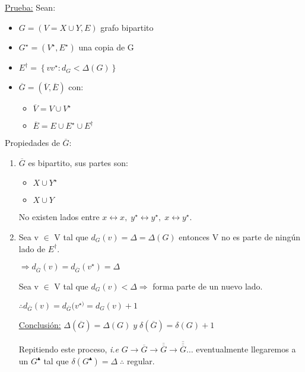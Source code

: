 \documentclass[12pt,a4paper]{report}
\begin{document}
		\underline{Prueba:} Sean:
		
		\begin{itemize}
			\item $G = (V = X \cup Y, E)$ grafo bipartito
			\item $G^{\star} = (V^{\star}, E^{\star})$ una copia de G
			\item $E^{\dag} = \left\lbrace vv^{\star} : d_{G} < \Delta(G) \right\rbrace$
			\item $\overline{G} = (\overline{V}, \overline{E})$ con:
				\begin{itemize}
					\item $\overline{V} = V \cup V^{\star}$
					\item $\overline{E} = E \cup E^{\star} \cup E^{\dag}$
				\end{itemize}
		\end{itemize}
		
		Propiedades de $\overline{G}$:
		\begin{enumerate}
			\item $\overline{G}$ es bipartito, sus partes son:
				\begin{itemize}
					\item $X \cup Y^{\star}$
					\item $X \cup Y$
				\end{itemize}
				
			No existen lados entre $x \leftrightarrow x, \; y^{\star} \leftrightarrow y^{\star}, \; x \leftrightarrow y^{\star}$.
			
			\item Sea v $\in$ V tal que $d_{G}(v) = \Delta = \Delta(G)$ entonces V no es parte de ningún lado de $E^{\dag}$.
			
			$\Rightarrow d_{\overline{G}}(v) = d_{\overline{G}}(v^{\star}) = \Delta$ 
			
			\vspace{5mm}
			Sea v $\in$ V tal que $d_{G}(v) < \Delta \Rightarrow$ forma parte de un nuevo lado. 
			
			$\therefore d_{\overline{G}}(v) = d_{\overline{G}}(v^{\star)} = d_{G}(v) + 1$
			
			\underline{Conclusión:} $ \Delta(\overline{G}) = \Delta(G) \; y \; \delta(\overline{G}) = \delta(G) + 1$
			
			Repitiendo este proceso, \textit{i.e} $G \rightarrow \overline{G} \rightarrow \overline{\overline{G}} \rightarrow \overline{\overline{\overline{G}}} \dotsc $ eventualmente llegaremos a un $G^{\blacktriangle}$ tal que $\delta(G^{\blacktriangle}) = \Delta \; \therefore $ regular.
		\end{enumerate}
		
\end{document}
